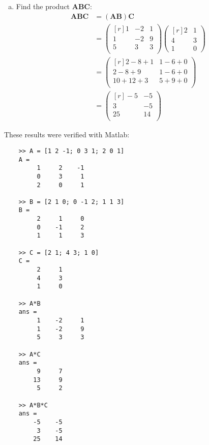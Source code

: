 \documentclass{article}
\begin{document}
\begin{multicols}{2}
\begin{enumerate}[(a)]
    \item Find the product $\mathbf{ABC}$:
    \[
        \begin{aligned}
        \mathbf{ABC} &= \left(\mathbf{AB}\right)\mathbf{C} \\
        & = 
        \begin{pmatrix*}[r]
        1 & -2 & 1 \\
        1 & -2 & 9 \\
        5 & 3 & 3 \\
        \end{pmatrix*}
        \begin{pmatrix*}[r]
        2 & 1 \\
        4 & 3 \\
        1 & 0
        \end{pmatrix*} \\
        & = 
        \begin{pmatrix*}[r]
        2-8+1 & 1-6+0 \\
        2-8+9 & 1-6+0 \\
        10+12+3 & 5+9+0 \\
        \end{pmatrix*} \\
        & = 
        \begin{pmatrix*}[r]
        -5 & -5 \\
        3 & -5 \\
        25 & 14 \\
        \end{pmatrix*}
        \end{aligned}
    \]
\end{enumerate}
These results were verified with Matlab:
\begin{verbatim}
    >> A = [1 2 -1; 0 3 1; 2 0 1]
    A =
         1     2    -1
         0     3     1
         2     0     1
         
    >> B = [2 1 0; 0 -1 2; 1 1 3]
    B =
         2     1     0
         0    -1     2
         1     1     3
         
    >> C = [2 1; 4 3; 1 0]
    C =
         2     1
         4     3
         1     0
         
    >> A*B
    ans =
         1    -2     1
         1    -2     9
         5     3     3
         
    >> A*C
    ans =
         9     7
        13     9
         5     2
         
    >> A*B*C
    ans =
        -5    -5
         3    -5
        25    14
\end{verbatim}
\end{multicols}
\end{document}
